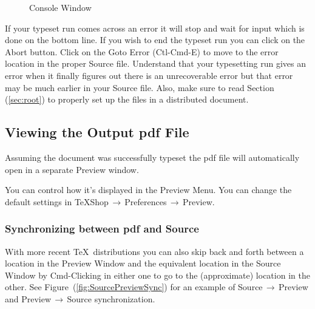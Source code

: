 \documentclass[letterpaper,11pt]{article}
\newcommand{\acr}[1]{\textsf{#1}}
\newcommand{\cmd}[1]{\textsf{#1}}
\newcommand{\mnu}[1]{\textsf{#1}}
\newcommand{\To}{\,\(\to\)\,}
\begin{document}
\begin{figure}
\centering
{}
\caption{Console Window}
\label{fig:ConsoleWindow}
\end{figure}

If your typeset run comes across an error it will stop and wait for input which is done on the bottom line. If you wish to end the typeset run you can click on the \cmd{Abort} button. Click on the \cmd{Goto Error} (\cmd{Ctl-Cmd-E}) to move to the error location in the proper Source file. Understand that your typesetting run gives an error when it finally figures out there is an unrecoverable error but that error may be much earlier in your Source file. Also, make sure to read Section (\ref{sec:root}) to properly set up the files in a distributed document.

\subsection{Viewing the Output \acr{pdf} File}

Assuming the document was successfully typeset the \acr{pdf} file will automatically open in a separate Preview window.

You can control how it's displayed in the \mnu{Preview} Menu. You can change the default settings in \mnu{TeXShop}\To\mnu{Preferences}\To\mnu{Preview}.

\subsubsection{Synchronizing between \acr{pdf} and Source}

With more recent \TeX\ distributions you can also skip back and forth between a location in the Preview Window and the equivalent location in the Source Window by \cmd{Cmd-Clicking} in either one to go to the (approximate) location in the other. See Figure~(\ref{fig:SourcePreviewSync}) for an example of Source\To Preview and Preview\To Source synchronization.
\end{document}
